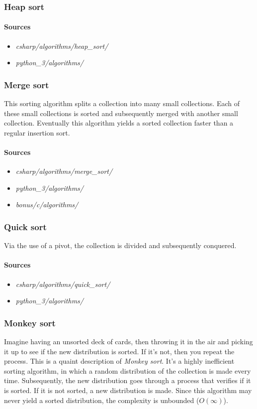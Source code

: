 \documentclass{article}
\begin{document}
\subsubsection{Heap sort}
\paragraph{Sources}
\begin{itemize}
\item{{\em csharp/algorithms/heap\_sort/}}
\item{{\em python\_3/algorithms/}}
\end{itemize}


\subsubsection{Merge sort}
This sorting algorithm splits a collection into many small collections.
Each of these small collections is sorted and subsequently merged with another small collection.
Eventually this algorithm yields a sorted collection faster than a regular insertion sort.

\paragraph{Sources}
\begin{itemize}
\item{{\em csharp/algorithms/merge\_sort/}}
\item{{\em python\_3/algorithms/}}
\item{{\em bonus/c/algorithms/}}
\end{itemize}


\subsubsection{Quick sort}
Via the use of a pivot, the collection is divided and subsequently conquered.

\paragraph{Sources}
\begin{itemize}
\item{{\em csharp/algorithms/quick\_sort/}}
\item{{\em python\_3/algorithms/}}
\end{itemize}


\subsubsection{Monkey sort}
Imagine having an unsorted deck of cards, then throwing it in the air and picking it up to see if the new distribution is sorted.
If it's not, then you repeat the process. This is a quaint description of {\em Monkey sort}.
It's a highly inefficient sorting algorithm, in which a random distribution of the collection is made every time.
Subsequently, the new distribution goes through a process that verifies if it is sorted. If it is not sorted, a new distribution is made.
Since this algorithm may never yield a sorted distribution, the complexity is unbounded (\(O(\infty)\)).
\end{document}
